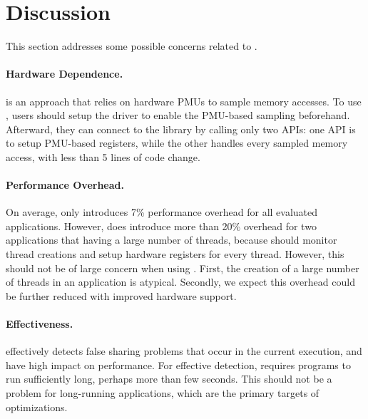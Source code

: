 \section{Discussion}

\label{sec:discuss}

This section addresses some possible concerns related to \Cheetah{}. 

\paragraph{Hardware Dependence.} \cheetah{} is an approach that relies on hardware PMUs to sample memory accesses. To use \cheetah{}, users should setup the driver to enable the PMU-based sampling beforehand. Afterward, they can connect to the \cheetah{} library by calling only two APIs: one API is to setup PMU-based registers, while the other handles every sampled memory access, with less than 5 lines of code change. 

\paragraph{Performance Overhead.} On average, \Cheetah{} only introduces 7\% performance overhead for all evaluated applications. However, \cheetah{} does introduce more than 20\% overhead for two applications that having a large number of threads, because \cheetah{} should monitor thread creations and setup hardware registers for every thread. However, this should not be of large concern when using \cheetah{}. First, the creation of a large number of threads in an application is atypical. Secondly, we expect this overhead could be further reduced with improved hardware support. 

\paragraph{Effectiveness.} \Cheetah{} effectively detects false sharing problems that occur in the current execution, and have high impact on performance. For effective detection, \Cheetah{} requires programs to run sufficiently long, perhaps more than few seconds. This should not be a problem for long-running applications, which are the primary targets of optimizations. 
